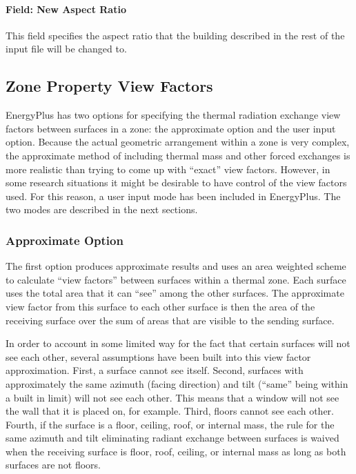 \paragraph{Field: New Aspect Ratio}\label{field-new-aspect-ratio}

This field specifies the aspect ratio that the building described in the rest of the input file will be changed to.

\subsection{Zone Property View Factors}\label{zone-property-view-factors}

EnergyPlus has two options for specifying the thermal radiation exchange view factors between surfaces in a zone: the approximate option and the user input option. Because the actual geometric arrangement within a zone is very complex, the approximate method of including thermal mass and other forced exchanges is more realistic than trying to come up with ``exact'' view factors. However, in some research situations it might be desirable to have control of the view factors used. For this reason, a user input mode has been included in EnergyPlus. The two modes are described in the next sections.

\subsubsection{Approximate Option}\label{approximate-option}

The first option produces approximate results and uses an area weighted scheme to calculate ``view factors'' between surfaces within a thermal zone. Each surface uses the total area that it can ``see'' among the other surfaces. The approximate view factor from this surface to each other surface is then the area of the receiving surface over the sum of areas that are visible to the sending surface.

In order to account in some limited way for the fact that certain surfaces will not see each other, several assumptions have been built into this view factor approximation. First, a surface cannot see itself. Second, surfaces with approximately the same azimuth (facing direction) and tilt (``same'' being within a built in limit) will not see each other. This means that a window will not see the wall that it is placed on, for example. Third, floors cannot see each other. Fourth, if the surface is a floor, ceiling, roof, or internal mass, the rule for the same azimuth and tilt eliminating radiant exchange between surfaces is waived when the receiving surface is floor, roof, ceiling, or internal mass as long as both surfaces are not floors.

